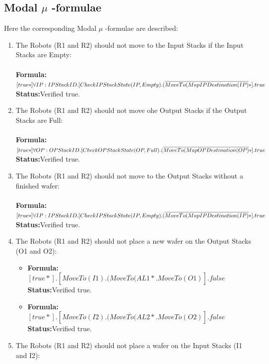 \documentclass[a4paper,12pt]{article}
\begin{document}
\subsection{Modal $\mu$ -formulae}
Here the corresponding Modal $\mu$ -formulae are described:
\begin{enumerate}
\item The Robots (R1 and R2) should not move to the Input Stacks if the Input Stacks are Empty:
\\
\\\textbf{Formula:} $[true*] \forall IP: IPStackID.[CheckIPStackState(IP, Empty).
\\(\overline{MoveTo(MapIPDestination(IP)}*].true$ \\\textbf{Status:}Verified true.
\item The Robots (R1 and R2) should not move ohe Output Stacks if the Output Stacks are Full:
\\
\\\textbf{Formula:} $[true*] \forall OP: OPStackID.[CheckOPStackState(OP, Full).
\\(\overline{MoveTo(MapOPDestination(OP)}*].true$ \\\textbf{Status:}Verified true.
\item The Robots (R1 and R2) should not move to the Output Stacks without a finished wafer:
\\
\\\textbf{Formula:} $[true*] \forall IP: IPStackID.[CheckIPStackState(IP, Empty).
\\(\overline{MoveTo(MapIPDestination(IP)}*].true$ \\\textbf{Status:}Verified true.
\item The Robots (R1 and R2) should not place a new wafer on the Output Stacks (O1 and O2):
    \begin{itemize}
	\item \textbf{Formula:} $[true*].[MoveTo(I1).(\overline{MoveTo(AL1}*.MoveTo(O1)].false$ \\\textbf{Status:}Verified true.
    \item \textbf{Formula:} $[true*].[MoveTo(I2).(\overline{MoveTo(AL2}*.MoveTo(O2)].false$ \\\textbf{Status:}Verified true.
	\end{itemize}
\item The Robots (R1 and R2) should not place a wafer on the Input Stacks (I1 and I2):

\end{enumerate}
\end{document}
